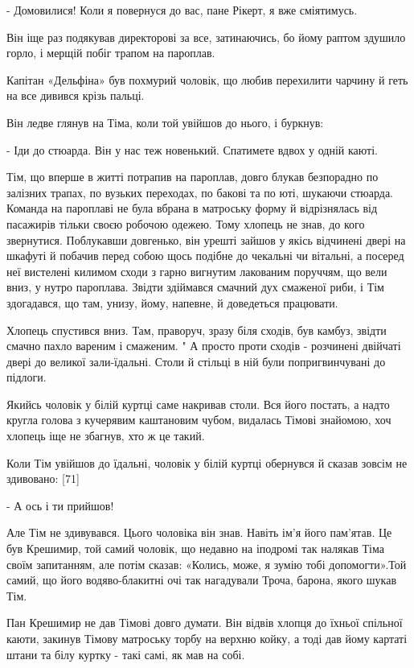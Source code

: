 - Домовилися! Коли я повернуся до вас, пане Рікерт, я вже сміятимусь.

Він іще раз подякував директорові за все, затинаючись, бо йому раптом здушило горло, і мерщій побіг трапом на пароплав.

Капітан «Дельфіна» був похмурий чоловік, що любив перехилити чарчину й геть на все дивився крізь пальці.

Він ледве глянув на Тіма, коли той увійшов до нього, і буркнув:

- Іди до стюарда. Він у нас теж новенький. Спатимете вдвох у одній каюті.

Тім, що вперше в житті потрапив на пароплав, довго блукав безпорадно по залізних трапах, по вузьких переходах, по бакові та по юті, шукаючи стюарда. Команда на пароплаві не була вбрана в матроську форму й відрізнялась від пасажирів тільки своєю робочою одежею. Тому хлопець не знав, до кого звернутися. Поблукавши довгенько, він урешті зайшов у якісь відчинені двері на шкафуті й побачив перед собою щось подібне до чекальні чи вітальні, а посеред неї вистелені килимом сходи з гарно вигнутим лакованим поруччям, що вели вниз, у нутро пароплава. Звідти здіймався смачний дух смаженої риби, і Тім здогадався, що там, унизу, йому, напевне, й доведеться працювати.

Хлопець спустився вниз. Там, праворуч, зразу біля сходів, був камбуз, звідти смачно пахло вареним і смаженим. " А просто проти сходів - розчинені двійчаті двері до великої зали-їдальні. Столи й стільці в ній були попригвинчувані до підлоги.

Якийсь чоловік у білій куртці саме накривав столи. Вся його постать, а надто кругла голова з кучерявим каштановим чубом, видалась Тімові знайомою, хоч хлопець іще не збагнув, хто ж це такий.

Коли Тім увійшов до їдальні, чоловік у білій куртці обернувся й сказав зовсім не здивовано: [71]

- А ось і ти прийшов!

Але Тім не здивувався. Цього чоловіка він знав. Навіть ім'я його пам'ятав. Це був Крешимир, той самий чоловік, що недавно на іподромі так налякав Тіма своїм запитанням, але потім сказав: «Колись, може, я зумію тобі допомогти».Той самий, що його водяво-блакитні очі так нагадували Троча, барона, якого шукав Тім.

Пан Крешимир не дав Тімові довго думати. Він відвів хлопця до їхньої спільної каюти, закинув Тімову матроську торбу на верхню койку, а тоді дав йому картаті штани та білу куртку - такі самі, як мав на собі.

